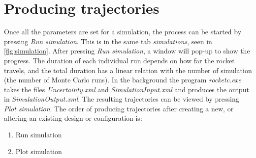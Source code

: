 \documentclass[11pt, a4paper]{article}
\begin{document}
\section{Producing trajectories} \label{sec:export}

Once all the parameters are set for a simulation, the process can be started by pressing \emph{Run simulation}. This is in the same tab \emph{simulations}, seen in \cref{fig:simulation}. After pressing \emph{Run simulation}, a window will pop-up to show the progress. The duration of each individual run depends on how far the rocket travels, and the total duration has a linear relation with the number of simulation (the number of Monte Carlo runs). In the background the program \emph{rocketc.exe} takes the files \emph{Uncertainty.xml} and \emph{SimulationInput.xml} and produces the output in \emph{SimulationOutput.xml}. The resulting trajectories can be viewed by pressing \emph{Plot simulation}. The order of producing trajectories after creating a new, or altering an existing design or configuration is:
\begin{enumerate}
\item Run simulation
\item Plot simulation
\end{enumerate}
\end{document}
